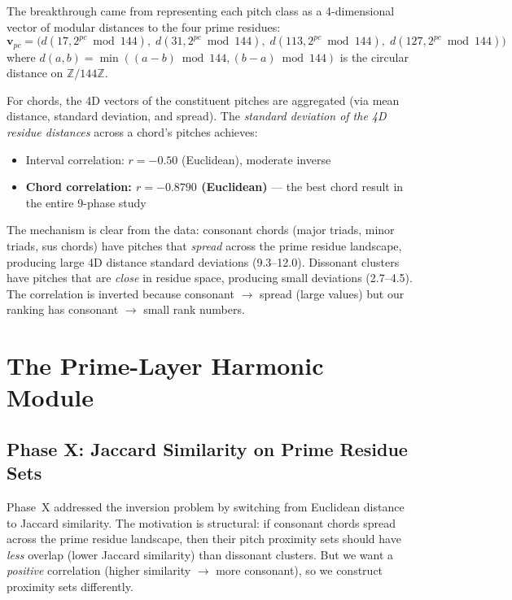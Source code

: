\documentclass[11pt,a4paper]{article}
\theoremstyle{definition}
\begin{document}
The breakthrough came from representing each pitch class as a 4-dimensional vector of modular distances to the four prime residues:
\begin{equation}\label{eq:residue_vec}
\mathbf{v}_{pc} = \bigl(d(17, 2^{pc} \bmod 144),\; d(31, 2^{pc} \bmod 144),\; d(113, 2^{pc} \bmod 144),\; d(127, 2^{pc} \bmod 144)\bigr)
\end{equation}
where $d(a, b) = \min((a-b) \bmod 144, (b-a) \bmod 144)$ is the circular distance on $\mathbb{Z}/144\mathbb{Z}$.

For chords, the 4D vectors of the constituent pitches are aggregated (via mean distance, standard deviation, and spread). The \emph{standard deviation of the 4D residue distances} across a chord's pitches achieves:
\begin{itemize}[leftmargin=2em]
\item Interval correlation: $r = -0.50$ (Euclidean), moderate inverse
\item \textbf{Chord correlation: $r = -0.8790$ (Euclidean)} --- the best chord result in the entire 9-phase study
\end{itemize}

The mechanism is clear from the data: consonant chords (major triads, minor triads, sus chords) have pitches that \emph{spread} across the prime residue landscape, producing large 4D distance standard deviations (9.3--12.0). Dissonant clusters have pitches that are \emph{close} in residue space, producing small deviations (2.7--4.5). The correlation is inverted because consonant $\to$ spread (large values) but our ranking has consonant $\to$ small rank numbers.

\section{The Prime-Layer Harmonic Module}\label{sec:phase10}

\subsection{Phase X: Jaccard Similarity on Prime Residue Sets}

Phase~X addressed the inversion problem by switching from Euclidean distance to Jaccard similarity. The motivation is structural: if consonant chords spread across the prime residue landscape, then their pitch proximity sets should have \emph{less} overlap (lower Jaccard similarity) than dissonant clusters. But we want a \emph{positive} correlation (higher similarity $\to$ more consonant), so we construct proximity sets differently.
\end{document}

